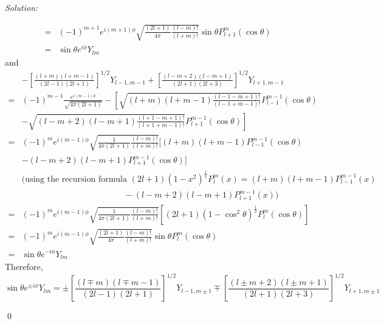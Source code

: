 \documentclass[12pt,a4paper]{article}
\newenvironment{sol}
    {\emph{Solution:}
    }
    {
    \qed
    }
\begin{document}
\begin{sol}
\begin{align}
\nonumber=&(-1)^{m+1}e^{i(m+1)\phi}\sqrt{\frac{(2l+1)}{4\pi}\frac{(l-m)!}{(l+m)!}}\sin\theta P_{l+1}^m(\cos\theta)\\
=&\sin\theta e^{i\phi}Y_{lm}
\end{align}
and
\begin{align}
\nonumber&-\left[\frac{(l+m)(l+m-1)}{(2l-1)(2l+1)}\right]^{1/2}Y_{l-1,m-1}+\left[\frac{(l-m+2)(l-m+1)}{(2l+1)(2l+3)}\right]^{1/2}Y_{l+1,m-1}\\
\nonumber=&(-1)^{m-1}\frac{e^{i(m-1)\phi}}{\sqrt{4\pi(2l+1)}}-\left[\sqrt{(l+m)(l+m-1)\frac{(l-1-m+1)!}{(l-1+m-1)!}}P_{l-1}^{m-1}(\cos\theta)\right.\\
\nonumber&\left.-\sqrt{(l-m+2)(l-m+1)\frac{(l+1-m+1)!}{(l+1+m-1)!}}P_{l+1}^{m-1}(\cos\theta)\right]\\
\nonumber=&(-1)^me^{i(m-1)\phi}\sqrt{\frac{1}{4\pi(2l+1)}\frac{(l-m)!}{(l+m)!}}[(l+m)(l+m-1)P_{l-1}^{m-1}(\cos\theta)\\
\nonumber&-(l-m+2)(l-m+1)P_{l+1}^{m-1}(\cos\theta)]\\
\nonumber&(\text{using the recursion formula }(2l+1)(1-x^2)^{\frac{1}{2}}P_l^m(x)=(l+m)(l+m-1)P_{l-1}^{m-1}(x)\\
\nonumber&\quad\quad\quad\quad\quad\quad\quad\quad\quad\quad\quad\quad-(l-m+2)(l-m+1)P_{l+1}^{m-1}(x))\\
\nonumber=&(-1)^me^{i(m-1)\phi}\sqrt{\frac{1}{4\pi(2l+1)}\frac{(l-m)!}{(l+m)!}}[(2l+1)(1-\cos^2\theta)^{\frac{1}{2}}P_l^m(\cos\theta)]\\
\nonumber=&(-1)^me^{i(m-1)\phi}\sqrt{\frac{(2l+1)}{4\pi}\frac{(l-m)!}{(l+m)!}}\sin\theta P_l^m(\cos\theta)\\
\nonumber=&\sin\theta e^{-i\phi}Y_{lm}
\end{align}
Therefore,
\begin{equation}
\sin\theta e^{\pm i\phi}Y_{lm}=\pm\left[\frac{(l\mp m)(l\mp m-1)}{(2l-1)(2l+1)}\right]^{1/2}Y_{l-1,m\pm1}\mp\left[\frac{(l\pm m+2)(l\pm m+1)}{(2l+1)(2l+3)}\right]^{1/2}Y_{l+1,m\pm1}
\end{equation}
\end{sol}
\end{document}
